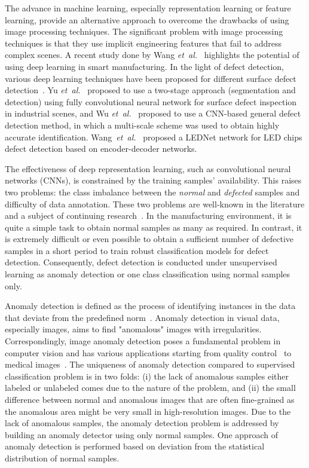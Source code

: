 \documentclass[journal]{IEEEtran}
\newcommand \andothers {\textit{et~al.}}
\begin{document}
The advance in machine learning, especially representation learning or feature learning, provide an alternative approach to overcome the drawbacks of using image processing techniques. The significant problem with image processing techniques is that they use implicit engineering features that fail to address complex scenes. A recent study done by Wang \andothers~\cite{wang2018deep} highlights the potential of using deep learning in smart manufacturing. In the light of defect detection, various deep learning techniques have been proposed for different surface defect detection~\cite{dai2020soldering,yin2020deep}.
Yu \andothers~\cite{yu2017fully} proposed to use a two-stage approach (segmentation and detection)
using fully convolutional neural network for surface defect inspection in
industrial scenes, and Wu \andothers~\cite{wu2017surface} proposed to use a CNN-based
general defect detection method, in which a multi-scale scheme
was used to obtain highly accurate identification. Wang~\andothers~\cite{wang2019lednet} proposed a LEDNet network for LED chips defect detection based on encoder-decoder networks. 

The effectiveness of deep representation learning, such as convolutional neural networks (CNNs), is constrained by the training samples' availability. This raises two problems: the class imbalance between the \textit{normal} and \textit{defected} samples and difficulty of data annotation. These two problems are well-known in the literature and a subject of continuing  research~\cite{hwang2019hexagan,oliver2018realistic,yoon2018gain}. In the manufacturing environment, it is quite a simple task to obtain normal samples as many as required. In contrast, it is extremely difficult or even possible to obtain a sufficient number of defective samples in a short period to train robust classification models for defect detection. Consequently, defect detection is conducted under unsupervised learning as anomaly detection or one class classification using normal samples only.  

Anomaly detection is defined as the process of identifying instances in the data that deviate from the predefined norm~\cite{chandola2009anomaly}. Anomaly detection in visual data, especially images, aims to find "anomalous" images with irregularities. Correspondingly, image anomaly detection poses a fundamental problem in computer vision and has various applications starting from quality control~\cite{bergmann2019mvtec} to medical images~\cite{baur2018deep}. The uniqueness of anomaly detection compared to supervised classification problem is in two folds: (i) the lack of anomalous samples either labeled or unlabeled comes due to the nature of the problem, and (ii) the small difference between normal and anomalous images that are often fine-grained as the anomalous area might be very small in high-resolution images. Due to the lack of anomalous samples, the anomaly detection problem is addressed by building an anomaly detector using only normal samples. One approach of anomaly detection is performed based on deviation from the statistical distribution of normal samples.
\end{document}
